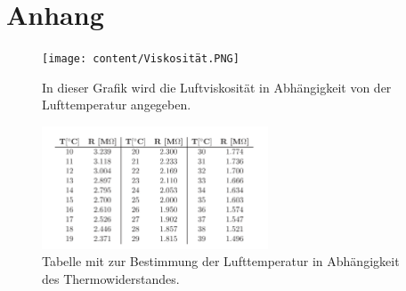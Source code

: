 \newpage

\section*{Anhang}

\begin{figure}
    \centering
    \texttt{[image: content/Viskosität.PNG]}
    \caption{In dieser Grafik wird die Luftviskosität in Abhängigkeit von der Lufttemperatur angegeben. \cite{v503}}
    \label{fig:viskosität}
\end{figure}

\begin{figure}
    \centering
    \includegraphics[width = 0.6\textwidth]{content/Thermowiderstand.PNG}
    \caption{Tabelle mit zur Bestimmung der Lufttemperatur in Abhängigkeit des Thermowiderstandes. \cite{v503}}
    \label{fig:Temperatur}
\end{figure}

\newpage

\begin{figure}
    \centering
    
\end{figure}

\newpage

\begin{figure}
    \centering
    
\end{figure}
